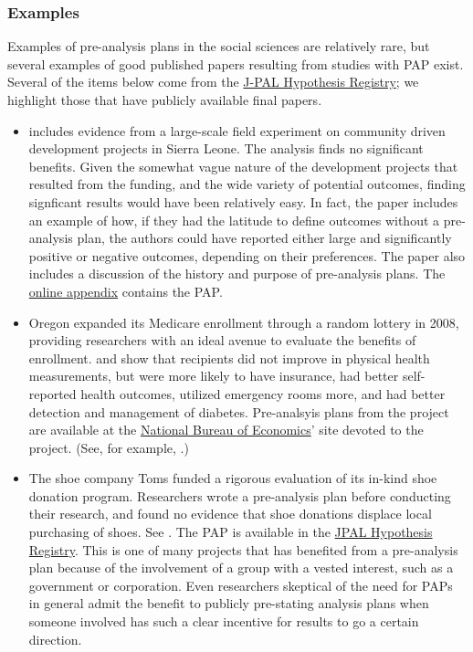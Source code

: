 \documentclass[12pt] {article}
\begin{document}
\subsubsection{Examples}\label{examples}
Examples of pre-analysis plans in the social sciences are relatively rare, but several examples of good published papers resulting from studies with PAP exist. Several of the items below come from the \href{http://www.povertyactionlab.org/Hypothesis-Registry}{J-PAL Hypothesis Registry}; we highlight those that have publicly available final papers. 


\begin{itemize}
\item 
 \cite{casey_reshaping_2012} includes evidence from a large-scale field experiment on community driven development projects in Sierra Leone. The analysis finds no significant benefits. Given the somewhat vague nature of the development projects that resulted from the funding, and the wide variety of potential outcomes, finding signficant results would have been relatively easy. In fact, the paper includes an example of how, if they had the latitude to define outcomes without a pre-analysis plan, the authors could have reported either large and significantly positive or negative outcomes, depending on their preferences. The paper also includes a discussion of the history and purpose of pre-analysis plans. The \href{http://emiguel.econ.berkeley.edu/assets/miguel_research/8/_Appendix__Reshaping_Institutions_-_Evidence__on__Aid__Impacts__Using__a__Pre___Analysis__Plan.pdf}{online appendix}
contains the PAP.

\item 
Oregon expanded its Medicare enrollment through a random lottery in 2008, providing researchers with an ideal avenue to evaluate the benefits of enrollment. \cite{finkelstein_oregon_2012, doi:10.1056/NEJMsa1212321} and \cite{Taubman17012014} show that recipients did not improve in physical health measurements, but were more likely to have insurance, had better self-reported health outcomes, utilized emergency rooms more, and had better detection and management of diabetes. Pre-analsyis plans from the project are available at the \href{http://www.nber.org/oregon/documents.html}{National Bureau of Economics}' site devoted to the project. (See, for example, \cite{taubman_oregon_2013, baicker_katherine_oregon_2014}.)


\item
The shoe company Toms funded a rigorous evaluation of its in-kind shoe donation program. Researchers wrote a pre-analysis plan before conducting their research, and found no evidence that shoe donations displace local purchasing of shoes. See \cite{wydick_-kind_2014, katz_elizabeth_pre-analysis_2013}. The PAP is available in the \href{http://www.povertyactionlab.org/doc/pre-analysis-planwydick2-12-13pdf}{JPAL Hypothesis Registry}. This is one of many projects that has benefited from a pre-analysis plan because of the involvement of a group with a vested interest, such as a government or corporation. Even researchers skeptical of the need for PAPs in general admit the benefit to publicly pre-stating analysis plans when someone involved has such a clear incentive for results to go a certain direction. 


\end{itemize}
\end{document}
